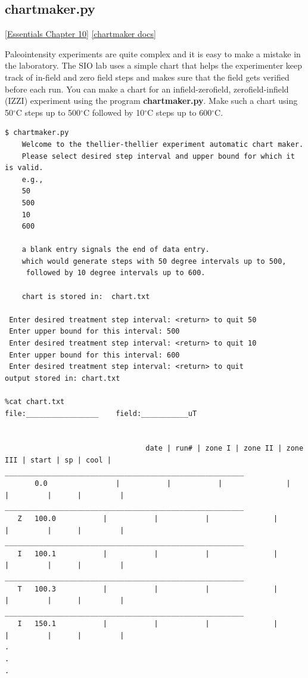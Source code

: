 \documentclass[11pt]{book}
\begin{document}
{{{

\subsection{chartmaker.py}
\label{ex:chartmaker}
\href{http://earthref.org/MAGIC/books/Tauxe/Essentials/WebBook3ch10.html#ch10}{[Essentials Chapter 10]}
\href{https://github.com/PmagPy/PmagPy/blob/master/programs/chartmaker.py}{[chartmaker docs]}

Paleointensity experiments are quite complex and it is easy to make a mistake in the laboratory.  The SIO lab uses a simple chart that helps the experimenter keep track of in-field and zero field steps and makes sure that the field gets verified before each run.   You can make a chart for an infield-zerofield, zerofield-infield (IZZI) experiment using the program {\bf chartmaker.py}.   Make such a chart using 50$^{\circ}$C steps up to 500$^{\circ}$C  followed by 10$^{\circ}$C steps up to 600$^{\circ}$C.

\begin{verbatim}
$ chartmaker.py
    Welcome to the thellier-thellier experiment automatic chart maker.
    Please select desired step interval and upper bound for which it is valid.
    e.g.,
    50
    500
    10
    600

    a blank entry signals the end of data entry.
    which would generate steps with 50 degree intervals up to 500,
     followed by 10 degree intervals up to 600.

    chart is stored in:  chart.txt

 Enter desired treatment step interval: <return> to quit 50
 Enter upper bound for this interval: 500
 Enter desired treatment step interval: <return> to quit 10
 Enter upper bound for this interval: 600
 Enter desired treatment step interval: <return> to quit
output stored in: chart.txt

%cat chart.txt
file:_________________    field:___________uT


                                 date | run# | zone I | zone II | zone III | start | sp | cool |
________________________________________________________
       0.0                |           |           |               |                |         |      |         |
________________________________________________________
   Z   100.0           |           |           |               |                |         |      |         |
________________________________________________________
   I   100.1           |           |           |               |                |         |      |         |
________________________________________________________
   T   100.3           |           |           |               |                |         |      |         |
________________________________________________________
   I   150.1           |           |           |               |                |         |      |         |
.
.
.


\end{verbatim}}}}
\end{document}
